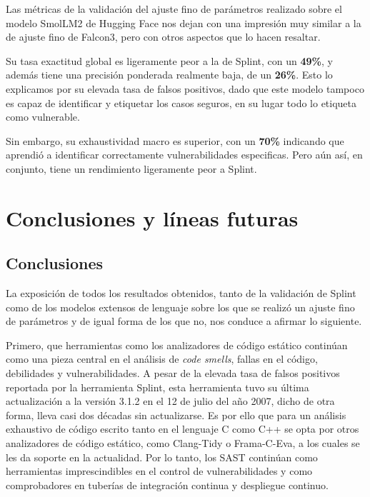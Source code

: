 \documentclass[12pt, a4paper, twoside]{article}
\begin{document}
Las métricas de la validación del ajuste fino de parámetros realizado sobre el modelo SmolLM2 de Hugging Face nos dejan con una impresión muy similar a la de ajuste fino de Falcon3, pero con otros aspectos que lo hacen resaltar.

Su tasa exactitud global es ligeramente peor a la de Splint, con un \textbf{49\%}, y además tiene una precisión ponderada realmente baja, de un \textbf{26\%}. Esto lo explicamos por su elevada tasa de falsos positivos, dado que este modelo tampoco es capaz de identificar y etiquetar los casos seguros, en su lugar todo lo etiqueta como vulnerable.

Sin embargo, su exhaustividad macro es superior, con un \textbf{70\%} indicando que aprendió a identificar correctamente vulnerabilidades especificas. Pero aún así, en conjunto, tiene un rendimiento ligeramente peor a Splint.


\section{Conclusiones y líneas futuras}
\subsection{Conclusiones}
La exposición de todos los resultados obtenidos, tanto de la validación de Splint como de los modelos extensos de lenguaje sobre los que se realizó un ajuste fino de parámetros y de igual forma de los que no, nos conduce a afirmar lo siguiente.

Primero, que herramientas como los analizadores de código estático continúan como una pieza central en el análisis de \textit{code smells}, fallas en el código, debilidades y vulnerabilidades. A pesar de la elevada tasa de falsos positivos reportada por la herramienta Splint, esta herramienta tuvo su última actualización a la versión 3.1.2 en el 12 de julio del año 2007, dicho de otra forma, lleva casi dos décadas sin actualizarse. Es por ello que para un análisis exhaustivo de código escrito tanto en el lenguaje C como C++ se opta por otros analizadores de código estático, como Clang-Tidy o Frama-C-Eva, a los cuales se les da soporte en la actualidad. Por lo tanto, los SAST continúan como herramientas imprescindibles en el control de vulnerabilidades y como comprobadores en tuberías de integración continua y despliegue continuo.
\end{document}
